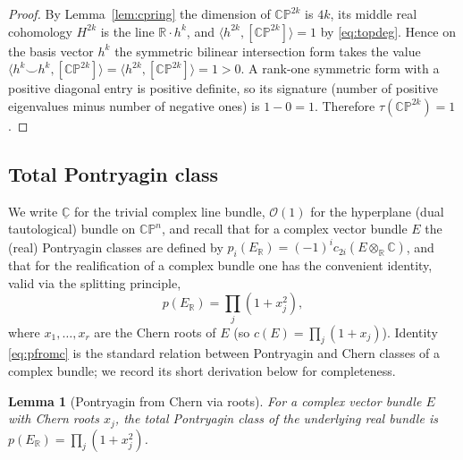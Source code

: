 \documentclass[12pt]{article}
\newtheorem{lemma}{Lemma}
\theoremstyle{definition}
\begin{document}
\begin{proof}
By Lemma~\ref{lem:cpring} the dimension of $\mathbb{CP}^{2k}$ is $4k$, its middle real
cohomology $H^{2k}$ is the line $\mathbb{R}\cdot h^k$, and
$\langle h^{2k},[\mathbb{CP}^{2k}]\rangle=1$ by \eqref{eq:topdeg}.  Hence on the basis
vector $h^k$ the symmetric bilinear intersection form takes the value
$\langle h^k\smile h^k,[\mathbb{CP}^{2k}]\rangle=\langle h^{2k},[\mathbb{CP}^{2k}]\rangle
=1>0$.  A rank-one symmetric form with a positive diagonal entry is positive definite, so
its signature (number of positive eigenvalues minus number of negative ones) is
$1-0=1$.  Therefore $\tau(\mathbb{CP}^{2k})=1$.
\end{proof}

\subsection*{Total Pontryagin class}

We write $\underline{\mathbb{C}}$ for the trivial complex line bundle, $\mathcal{O}(1)$
for the hyperplane (dual tautological) bundle on $\mathbb{CP}^n$, and recall that for a
complex vector bundle $E$ the (real) Pontryagin classes are defined by
$p_i(E_{\mathbb{R}})=(-1)^i c_{2i}(E\otimes_{\mathbb{R}}\mathbb{C})$, and that for the
realification of a complex bundle one has the convenient identity, valid via the
splitting principle,
\[
p(E_{\mathbb{R}})=\prod_j (1+x_j^2),
\tag{$\dagger$}\label{eq:pfromc}
\]
where $x_1,\dots,x_r$ are the Chern roots of $E$ (so $c(E)=\prod_j(1+x_j)$).  Identity
\eqref{eq:pfromc} is the standard relation between Pontryagin and Chern classes of a
complex bundle; we record its short derivation below for completeness.

\begin{lemma}[Pontryagin from Chern via roots]\label{lem:pfromc}
For a complex vector bundle $E$ with Chern roots $x_j$, the total Pontryagin class of the
underlying real bundle is $p(E_{\mathbb{R}})=\prod_j(1+x_j^2)$.
\end{lemma}
\end{document}
